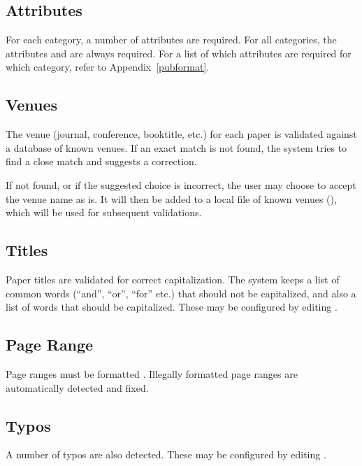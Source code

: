 \subsection{Attributes}

For each category, a number of attributes are required. For all
categories, the attributes  and  are always
required. For a list of which attributes are required for which
category, refer to Appendix~\ref{pubformat}.

\subsection{Venues}

The venue (journal, conference, booktitle, etc.) for each paper is
validated against a database of known venues. If an exact match is not
found, the system tries to find a close match and suggests a
correction.

If not found, or if the suggested choice is incorrect, the user may
choose to accept the venue name as is. It will then be added to a
local file of known venues (), which will be used for
subsequent validations.

\subsection{Titles}

Paper titles are validated for correct capitalization. The system
keeps a list of common words (``and'', ``or'', ``for'' etc.) that
should not be capitalized, and also a list of words that should be
capitalized. These may be configured by editing
.

\subsection{Page Range}

Page ranges must be formatted . Illegally formatted page
ranges are automatically detected and fixed.

\subsection{Typos}

A number of typos are also detected. These may be configured by
editing .
